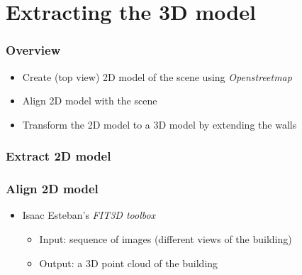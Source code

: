 \documentclass{beamer}
\begin{document}




\section{Extracting the 3D model}
\frame
{
	\frametitle{Overview}
	\begin{itemize}
	\item <+-| alert@+> Create (top view) 2D model of the scene using \emph{Openstreetmap}
	\item <+-| alert@+> Align 2D model with the scene 
	\item <+-| alert@+> Transform the 2D model to a 3D model by extending the walls
	\end{itemize}
}

\frame
{
	\frametitle{Extract 2D model}
}

\frame
{
	\frametitle{Align 2D model}
	\begin{itemize}
	\item <+-| alert@+> Isaac Esteban's \emph{FIT3D toolbox}
		\begin{itemize}
		\item <+-| alert@+> Input: sequence of images (different views of the building)
		\item <+-| alert@+> Output: a 3D point cloud of the building
		\end{itemize}
	\end{itemize}
}

\frame
{
}
\end{document}
